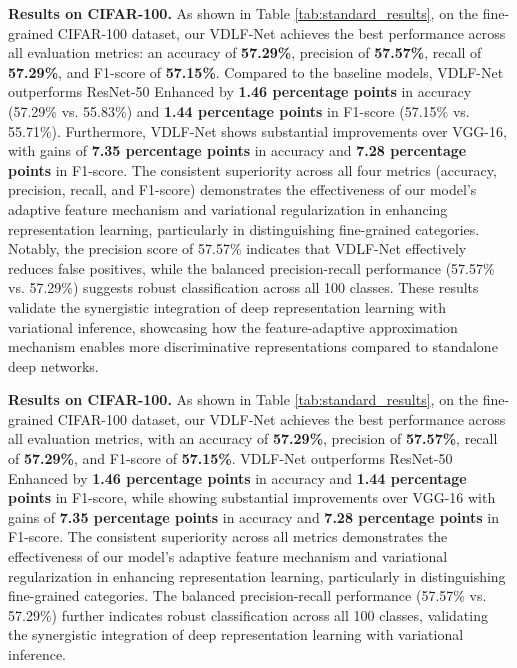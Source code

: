 \textbf{Results on CIFAR-100.} As shown in Table \ref{tab:standard_results}, 
on the fine-grained CIFAR-100 dataset, our VDLF-Net achieves the best performance 
across all evaluation metrics: an accuracy of \textbf{57.29\%}, precision of 
\textbf{57.57\%}, recall of \textbf{57.29\%}, and F1-score of \textbf{57.15\%}. 
Compared to the baseline models, VDLF-Net outperforms ResNet-50 Enhanced by 
\textbf{1.46 percentage points} in accuracy (57.29\% vs. 55.83\%) and 
\textbf{1.44 percentage points} in F1-score (57.15\% vs. 55.71\%). 
Furthermore, VDLF-Net shows substantial improvements over VGG-16, with gains of 
\textbf{7.35 percentage points} in accuracy and \textbf{7.28 percentage points} in F1-score. 
The consistent superiority across all four metrics (accuracy, precision, recall, and F1-score) 
demonstrates the effectiveness of our model's adaptive feature mechanism and variational 
regularization in enhancing representation learning, particularly in distinguishing fine-grained 
categories. Notably, the precision score of 57.57\% indicates that VDLF-Net effectively reduces 
false positives, while the balanced precision-recall performance (57.57\% vs. 57.29\%) suggests 
robust classification across all 100 classes. These results validate the synergistic integration 
of deep representation learning with variational inference, showcasing how the feature-adaptive 
approximation mechanism enables more discriminative representations compared to standalone 
deep networks.

\textbf{Results on CIFAR-100.} As shown in Table \ref{tab:standard_results}, 
on the fine-grained CIFAR-100 dataset, our VDLF-Net achieves the best performance 
across all evaluation metrics, with an accuracy of \textbf{57.29\%}, precision of 
\textbf{57.57\%}, recall of \textbf{57.29\%}, and F1-score of \textbf{57.15\%}. 
VDLF-Net outperforms ResNet-50 Enhanced by \textbf{1.46 percentage points} in accuracy 
and \textbf{1.44 percentage points} in F1-score, while showing substantial improvements 
over VGG-16 with gains of \textbf{7.35 percentage points} in accuracy and 
\textbf{7.28 percentage points} in F1-score. The consistent superiority across all metrics 
demonstrates the effectiveness of our model's adaptive feature mechanism and variational 
regularization in enhancing representation learning, particularly in distinguishing fine-grained 
categories. The balanced precision-recall performance (57.57\% vs. 57.29\%) further indicates 
robust classification across all 100 classes, validating the synergistic integration of deep 
representation learning with variational inference.

